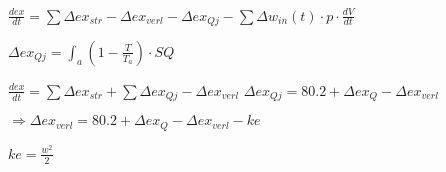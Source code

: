 \( \frac{d ex}{dt} = \sum \Delta ex_{str} - \Delta ex_{verl} - \Delta ex_{Qj} - \sum \Delta w_{in}(t) \cdot p \cdot \frac{d V}{dt} \)  

\( \Delta ex_{Qj} = \int_a (1 - \frac{T}{T_a}) \cdot SQ \)  

\( \frac{d ex}{dt} = \sum \Delta ex_{str} + \sum \Delta ex_{Qj} - \Delta ex_{verl} \)  
\( \Delta ex_{Qj} = 80.2 + \Delta ex_{Q} - \Delta ex_{verl} \)  

\( \Rightarrow \Delta ex_{verl} = 80.2 + \Delta ex_{Q} - \Delta ex_{verl} - ke \)  

\( ke = \frac{w^2}{2} \)